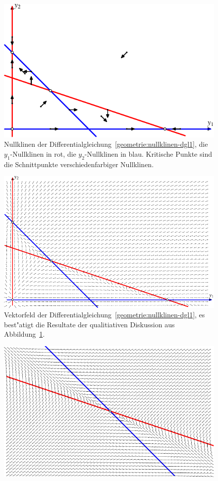 \begin{beispiel}
\begin{figure}
\centering
\includegraphics{chapters/images/nullklinen-1.pdf}
\caption{Nullklinen der Differentialgleichung~\eqref{geometrie:nullklinen-dgl1},
die $y_1$-Nullklinen in rot, die $y_2$-Nullklinen in blau.
Kritische Punkte sind die Schnittpunkte verschiedenfarbiger Nullklinen.
\label{geometrie:nullklinen1}}
\end{figure}
\begin{figure}
\centering
\includegraphics{chapters/images/nullklinen-2.pdf}
\caption{Vektorfeld der Differentialgleichung~\eqref{geometrie:nullklinen-dgl1},
es best"atigt die Resultate der qualitiativen Diskussion aus
Abbildung~\ref{geometrie:nullklinen1}.
\label{geometrie:nullklinen-fluss}}
\end{figure}
\begin{figure}
\centering
\includegraphics{chapters/images/nullklinen-3.pdf}

\end{figure}
\end{beispiel}
